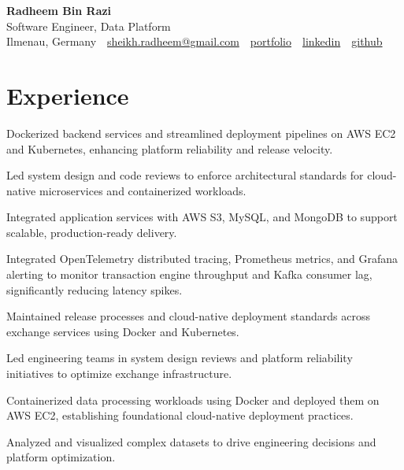 \documentclass[10pt,a4paper]{resume}
\makeatletter
\newcommand{\Portfolio}{https://radheem.github.io/my-cv}
\newcommand{\PortfolioText}{portfolio}
\newcommand{\GitHub}{https://github.com/radheem}
\newcommand{\LinkedIn}{https://www.linkedin.com/in/radheem-razi}
\newcommand{\Email}{sheikh.radheem@gmail.com}
\makeatother
\begin{document}
\begin{center}
  {\huge\bfseries Radheem Bin Razi}\\[3pt]
  {\large Software Engineer, Data Platform}\\[6pt]
  \small
  Ilmenau, Germany \,\textbar\,
  \href{mailto:\Email}{\Email} \,\textbar\,
  \href{\Portfolio}{\PortfolioText} \,\textbar\,
  \href{\LinkedIn}{linkedin} \,\textbar\,
  \href{\GitHub}{github}
\end{center}
\vspace{2pt}

\section{Experience}

\bullets
  \item Dockerized backend services and streamlined deployment pipelines on AWS EC2 and Kubernetes, enhancing platform reliability and release velocity.
  \item Led system design and code reviews to enforce architectural standards for cloud-native microservices and containerized workloads.
  \item Integrated application services with AWS S3, MySQL, and MongoDB to support scalable, production-ready delivery.
\bulletsend
\vspace{1.5pt}
\bullets
  \item Integrated OpenTelemetry distributed tracing, Prometheus metrics, and Grafana alerting to monitor transaction engine throughput and Kafka consumer lag, significantly reducing latency spikes.
  \item Maintained release processes and cloud-native deployment standards across exchange services using Docker and Kubernetes.
  \item Led engineering teams in system design reviews and platform reliability initiatives to optimize exchange infrastructure.
\bulletsend
\vspace{1.5pt}
\bullets
  \item Containerized data processing workloads using Docker and deployed them on AWS EC2, establishing foundational cloud-native deployment practices.
  \item Analyzed and visualized complex datasets to drive engineering decisions and platform optimization.
\bulletsend
\vspace{1.5pt}
\end{document}
